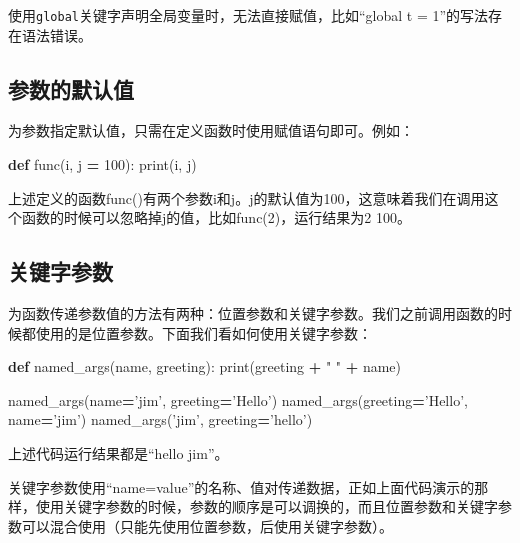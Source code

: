 \documentclass[]{ctexbook}
\newenvironment{Shaded}{\begin{snugshade}}{\end{snugshade}}
\newcommand{\BuiltInTok}[1]{#1}
\newcommand{\DecValTok}[1]{\textcolor[rgb]{0.00,0.00,0.81}{#1}}
\newcommand{\KeywordTok}[1]{\textcolor[rgb]{0.13,0.29,0.53}{\textbf{#1}}}
\newcommand{\NormalTok}[1]{#1}
\newcommand{\OperatorTok}[1]{\textcolor[rgb]{0.81,0.36,0.00}{\textbf{#1}}}
\newcommand{\StringTok}[1]{\textcolor[rgb]{0.31,0.60,0.02}{#1}}
\begin{document}
使用\texttt{global}关键字声明全局变量时，无法直接赋值，比如``global t = 1''的写法存在语法错误。

\hypertarget{ux53c2ux6570ux7684ux9ed8ux8ba4ux503c}{%
\subsection{参数的默认值}\label{ux53c2ux6570ux7684ux9ed8ux8ba4ux503c}}

为参数指定默认值，只需在定义函数时使用赋值语句即可。例如：

\begin{Shaded}
\begin{Highlighting}[]
\KeywordTok{def}\NormalTok{ func(i, j }\OperatorTok{=} \DecValTok{100}\NormalTok{):}
    \BuiltInTok{print}\NormalTok{(i, j)}
\end{Highlighting}
\end{Shaded}

上述定义的函数func()有两个参数i和j。j的默认值为100，这意味着我们在调用这个函数的时候可以忽略掉j的值，比如func(2)，运行结果为2 100。

\hypertarget{ux5173ux952eux5b57ux53c2ux6570}{%
\subsection{关键字参数}\label{ux5173ux952eux5b57ux53c2ux6570}}

为函数传递参数值的方法有两种：位置参数和关键字参数。我们之前调用函数的时候都使用的是位置参数。下面我们看如何使用关键字参数：

\begin{Shaded}
\begin{Highlighting}[]
\KeywordTok{def}\NormalTok{ named_args(name, greeting):}
    \BuiltInTok{print}\NormalTok{(greeting }\OperatorTok{+} \StringTok{" "} \OperatorTok{+}\NormalTok{ name)}

\NormalTok{named_args(name}\OperatorTok{=}\StringTok{'jim'}\NormalTok{, greeting}\OperatorTok{=}\StringTok{'Hello'}\NormalTok{)}
\NormalTok{named_args(greeting}\OperatorTok{=}\StringTok{'Hello'}\NormalTok{, name}\OperatorTok{=}\StringTok{'jim'}\NormalTok{)}
\NormalTok{named_args(}\StringTok{'jim'}\NormalTok{, greeting}\OperatorTok{=}\StringTok{'hello'}\NormalTok{)}
\end{Highlighting}
\end{Shaded}

上述代码运行结果都是``hello jim''。

关键字参数使用``name=value''的名称、值对传递数据，正如上面代码演示的那样，使用关键字参数的时候，参数的顺序是可以调换的，而且位置参数和关键字参数可以混合使用（只能先使用位置参数，后使用关键字参数）。
\end{document}

